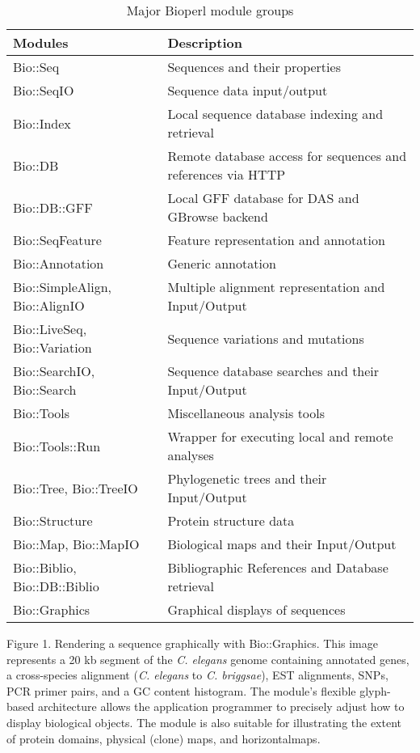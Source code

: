 \documentclass[12pt]{article}
\begin{document}
\begin{table}[h]
\begin{tabular}{|l|l|}
\hline
\textbf{Modules} & \textbf{Description} \\
\hline
Bio::Seq &  Sequences and their properties \\
Bio::SeqIO & Sequence data input/output \\
Bio::Index & Local sequence database indexing and retrieval \\ 
Bio::DB & Remote database access for sequences and references via HTTP \\
Bio::DB::GFF & Local GFF database for DAS and GBrowse backend \\
Bio::SeqFeature & Feature representation and annotation \\
Bio::Annotation & Generic annotation \\
Bio::SimpleAlign, Bio::AlignIO  & Multiple alignment representation
and Input/Output \\
Bio::LiveSeq, Bio::Variation & Sequence variations and mutations \\
Bio::SearchIO, Bio::Search  & Sequence database searches and their Input/Output \\
Bio::Tools &  Miscellaneous analysis tools \\
Bio::Tools::Run &  Wrapper for executing local and remote analyses \\
Bio::Tree, Bio::TreeIO & Phylogenetic trees and their Input/Output  \\
Bio::Structure & Protein structure data \\
Bio::Map, Bio::MapIO & Biological maps and their Input/Output \\
Bio::Biblio, Bio::DB::Biblio & Bibliographic References and Database
retrieval \\ 
Bio::Graphics & Graphical displays of sequences \\
\hline
\end{tabular}
\caption{Major Bioperl module groups}
\label{tab:modules}
\end{table}

\newpage


Figure 1.  Rendering a sequence graphically with Bio::Graphics.  This
image represents a 20 kb segment of the \textit{C. elegans} genome
containing annotated genes, a cross-species alignment
(\textit{C. elegans} to \textit{C. briggsae}), EST alignments, SNPs,
PCR primer pairs, and a GC content histogram.  The module's flexible
glyph-based architecture allows the application programmer to
precisely adjust how to display biological objects.  The module is
also suitable for illustrating the extent of protein domains, physical
(clone) maps, and horizontalmaps.
\end{document}

